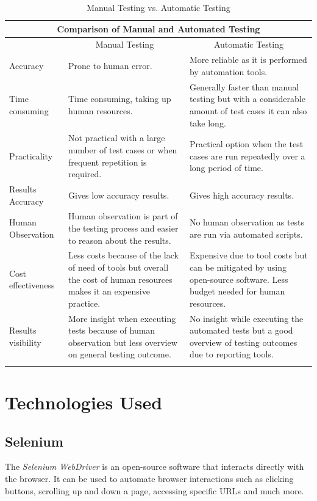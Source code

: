 \begin{center}
\begin{longtable}{ |p{3.7cm}|p{4.6cm}|p{4.6cm}| }
 \hline
 	\multicolumn{3}{|c|}{Comparison of Manual and Automated Testing} \\
 \hline
 	& \multicolumn{1}{|c|}{Manual Testing} & \multicolumn{1}{|c|}{Automatic Testing} \\
 \hline
 	Accuracy & Prone to human error. & More reliable as it is performed by automation tools.\\
 \hline
    Time consuming & Time consuming, taking up human resources. & Generally faster than manual testing but with a considerable amount of test cases it can also take long.\\
 \hline
    Practicality & Not practical with a large number of test cases or when frequent repetition is required. & Practical option when the test cases are run repeatedly over a long period of time.\\
 \hline
    Results Accuracy & Gives low accuracy results. & Gives high accuracy results.\\
 \hline
    Human Observation & Human observation is part of the testing process and easier to reason about the results. & No human observation as tests are run via automated scripts.\\
 \hline
    Cost effectiveness & Less costs because of the lack of need of tools but overall the cost of human resources makes it an expensive practice. & Expensive due to tool costs but can be mitigated by using open-source software. Less budget needed for human resources.\\
 \hline
    Results visibility & More insight when executing tests because of human observation but less overview on general testing outcome. & No insight while executing the automated tests but a good overview of testing outcomes due to reporting tools.\\
 \hline
 \caption{Manual Testing vs. Automatic Testing}
 \label{tab:manual-vs-automatic}
\end{longtable}
\end{center}

\section{Technologies Used}
\label{sec:technologies-used}

\subsection{Selenium}
\label{subsec:selenium}
The \textit{Selenium WebDriver} is an open-source software that interacts directly with the browser. It can be used to automate browser interactions such as clicking buttons, scrolling up and down a page, accessing specific URLs and much more.
\\

